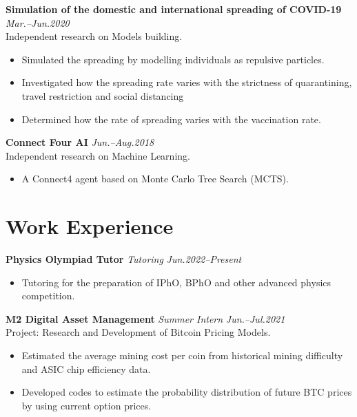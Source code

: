 \documentclass[11pt,a4paper,roman]{moderncv}        %
\begin{document}
\textbf{Simulation of the domestic and international spreading of COVID-19} \hfill \textit{Mar.--Jun.2020} 
\vspace*{1mm}\\
{Independent research on Models building.}
\vspace*{1mm}
\begin{itemize}
	\item Simulated the spreading by modelling individuals as repulsive particles.
    \item Investigated how the spreading rate varies with the strictness of quarantining, travel restriction and  social distancing
    \item Determined how the rate of spreading varies with the vaccination rate.\\
\end{itemize}

\textbf{Connect Four AI} \hfill \textit{Jun.--Aug.2018} 
\vspace*{1mm}\\
{Independent research on Machine Learning.}
\vspace*{1mm}
\begin{itemize}
	\item A Connect4 agent based on Monte Carlo Tree Search (MCTS).
\end{itemize}

\section{Work Experience}

\textbf{Physics Olympiad Tutor} \textit{Tutoring} \hfill \textit{Jun.2022--Present}
\vspace*{1mm}
\begin{itemize}
	\item Tutoring for the preparation of IPhO, BPhO and other advanced physics competition.\\
\end{itemize}

\textbf{M2 Digital Asset Management} \textit{Summer Intern} \hfill \textit{Jun.--Jul.2021}
\vspace*{1mm}\\
{Project: Research and Development of Bitcoin Pricing Models.}
\vspace*{1mm}
\begin{itemize}
	\item Estimated the average mining cost per coin from historical mining difficulty and ASIC chip efficiency data.
	\item Developed codes to estimate the probability distribution of future BTC prices by using current option prices.
\end{itemize}
\end{document}
